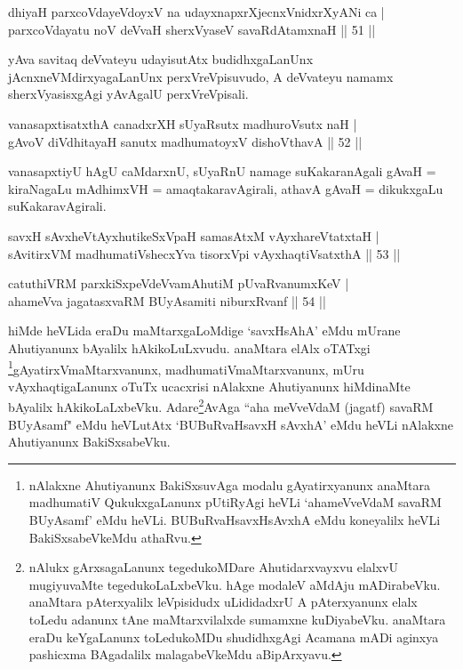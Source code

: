 
\begin{shl}
dhiyaH parxcoVdayeVdoyxV na udayxnapxrXjecnxVnidxrXyANi ca | \\
parxcoVdayatu noV deVvaH sherxVyaseV savaRdA\s \s tamxnaH \hfill|| 51 || 
\end{shl}

\begin{artha}
yAva savitaq deVvateyu udayisutAtx budidhxgaLanUnx 
jAcnxneVMdirxyagaLanUnx perxVreVpisuvudo, A deVvateyu namamx 
sherxVyasisxgAgi yAvAgalU perxVreVpisali.
\end{artha}


\begin{shl}
vanasapxtisatxthA canadxrXH sUyaRsutx madhuroV\s sutx naH | \\
gAvoV diVdhitayaH sanutx madhumatoyxV dishoV\s thavA  \hfill|| 52 || 
\end{shl}

\begin{artha}
vanasapxtiyU hAgU caMdarxnU, sUyaRnU namage suKakaranAgali gAvaH = 
kiraNagaLu mAdhimxVH = amaqtakaravAgirali, athavA gAvaH = dikukxgaLu 
suKakaravAgirali.
\end{artha}

\begin{shl}
savxH sAvxheVtAyxhutikeSxVpaH samasAtxM vAyxhareVtatxtaH | \\
sAvitirxVM madhumatiVshecxYva tisorxV\s pi vAyxhaqtiVsatxthA \hfill|| 53 || 
\end{shl}

\begin{shl}
catuthiVRM parxkiSxpeVdeVvamAhutiM pUvaRvanumxKeV | \\
ahameVva jagatasxvaRM BUyAsamiti niburxRvanf \hfill|| 54 || 
\end{shl}

\begin{artha}
hiMde heVLida eraDu maMtarxgaLoMdige `savxHsAhA' eMdu mUrane 
Ahuti\-yanunx bAyalilx hAkikoLuLxvudu. anaMtara elAlx oTATxgi 
\footnote[1]{nAlakxne Ahutiyanunx BakiSxsuvAga modalu gAyatirxyanunx 
anaMtara madhumatiV QukukxgaLanunx pUtiRyAgi heVLi `ahameVveVdaM 
savaRM BUyAsamf' eMdu heVLi. BUBuRvaHsavxHsAvxhA eMdu koneyalilx heVLi 
BakiSxsabeVkeMdu athaRvu.}gAyatirxVmaMtarxvanunx, madhumatiVmaMtarxvanunx, mUru 
vAyxhaqtigaLanunx oTuTx ucacxrisi nAlakxne Ahuti\-yanunx hiMdinaMte 
bAyalilx hAkikoLaLxbeVku. Adare\footnote[2]{nAlukx gArxsagaLanunx 
tegedukoMDare Ahutidarxvayxvu elalxvU mugiyuvaMte tegedukoLaLxbeVku. 
hAge modaleV aMdAju mADirabeVku. anaMtara pAterxyalilx leVpisidudx 
uLididadxrU A pAterxyanunx elalx toLedu adanunx tAne maMtarxvilalxde 
sumamxne kuDiyabeVku. anaMtara eraDu keYgaLanunx toLedukoMDu 
shudidhxgAgi Acamana mADi aginxya pashicxma BAgadalilx malagabeVkeMdu 
aBipArxyavu.}AvAga ``aha meVveVdaM 
(jagatf) savaRM BUyAsamf" eMdu heVLutAtx `BUBuRvaHsavxH sAvxhA' eMdu 
heVLi nAlakxne Ahutiyanunx BakiSxsabeVku.
\end{artha}

